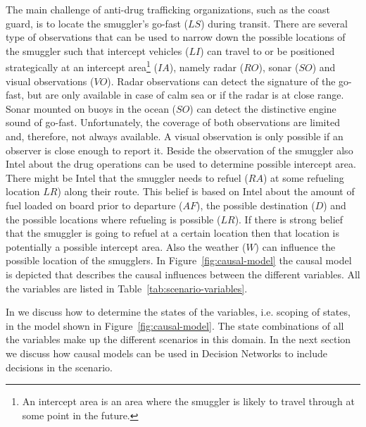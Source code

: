 \documentclass[conference]{IEEEtran}
\begin{document}
The main challenge of anti-drug trafficking organizations, such as the coast guard, is to locate the smuggler's go-fast ($LS$) during transit. There are several type of observations that can be used to narrow down the possible locations of the smuggler such that intercept vehicles ($LI$) can travel to or be positioned strategically at an intercept area\footnote{An intercept area is an area where the smuggler is likely to travel through at some point in the future.} ($IA$), namely radar ($RO$), sonar ($SO$) and visual observations ($VO$). Radar observations can detect the signature of the go-fast, but are only available in case of calm sea or if the radar is at close range. Sonar mounted on buoys in the ocean ($SO$) can detect the distinctive engine sound of go-fast. Unfortunately, the coverage of both observations are limited and, therefore, not always available. A visual observation is only possible if an observer is close enough to report it. Beside the observation of the smuggler also Intel about the drug operations can be used to determine possible intercept area. There might be Intel that the smuggler needs to refuel ($RA$) at some refueling location $LR$) along their route. This belief is based on Intel about the amount of fuel loaded on board prior to departure ($AF$), the possible destination ($D$) and the possible locations where refueling is possible ($LR$). If there is strong belief that the smuggler is going to refuel at a certain location then that location is potentially a possible intercept area. Also the weather ($W$) can influence the possible location of the smugglers. In Figure~\ref{fig:causal-model} the causal model is depicted that describes the causal influences between the different variables. All the variables are listed in Table~\ref{tab:scenario-variables}.

In \cite{conrado14if} we discuss how to determine the states of the variables, i.e. scoping of states, in the model shown in Figure~\ref{fig:causal-model}. The state combinations of all the variables make up the different scenarios in this domain. In the next section we discuss how causal models can be used in Decision Networks to include decisions in the scenario.
\end{document}
